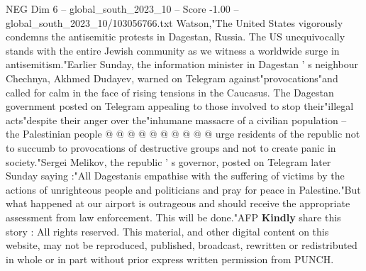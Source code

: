 \begin{textsample}{NEG Dim 6 – global\_south\_2023\_10 – Score -1.00 – global\_south\_2023\_10/103056766.txt}
Watson,"The United States vigorously condemns the antisemitic protests in Dagestan, Russia.
The US unequivocally stands with the entire Jewish community as we witness a worldwide surge in antisemitism."Earlier Sunday, the information minister in Dagestan ' s neighbour Chechnya, Akhmed Dudayev, warned on Telegram against"provocations"and called for calm in the face of rising tensions in the Caucasus.
The Dagestan government posted on Telegram appealing to those involved to stop their"illegal acts"despite their anger over the"inhumane massacre of a civilian population -- the Palestinian people @ @ @ @ @ @ @ @ @ @ urge residents of the republic not to succumb to provocations of destructive groups and not to create panic in society."Sergei Melikov, the republic ' s governor, posted on Telegram later Sunday saying :"All Dagestanis empathise with the suffering of victims by the actions of unrighteous people and politicians and pray for peace in Palestine."But what happened at our airport is outrageous and should receive the appropriate assessment from law enforcement.
This will be done."AFP \textbf{Kindly} share this story : All rights reserved.
This material, and other digital content on this website, may not be reproduced, published, broadcast, rewritten or redistributed in whole or in part without prior express written permission from PUNCH.

\end{textsample}
